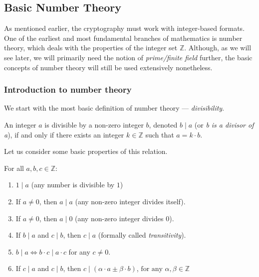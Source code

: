 \documentclass[../lecture-notes.tex]{subfiles}
\begin{document}
\subsection{Basic Number Theory}

As mentioned earlier, the cryptography must work with integer-based formats. 
One of the earliest and most fundamental branches of mathematics is number theory, which 
deals with the properties of the integer set $\mathbb{Z}$. Although, as we will see later, 
we will primarily need the notion of \emph{prime/finite field} further, the basic concepts 
of number theory will still be used extensively nonetheless.

\subsubsection{Introduction to number theory}

We start with the most basic definition of number theory --- \emph{divisibility}.

\begin{definition}
    An integer $a$ is divisible by a non-zero integer $b$, denoted $b \mid a$ (or \emph{b is a divisor of a}), if and only if there exists an integer $k \in \mathbb{Z}$ such that $a = k \cdot b$.
\end{definition}

Let us consider some basic properties of this relation.

\begin{lemma}
    For all $a, b, c \in \mathbb{Z}:$
    \hfill
    \begin{enumerate}
        \item $1 \mid a$ (any number is divisible by $1$)
        \item If $a \neq 0$, then $a \mid a$ (any non-zero integer divides itself).
        \item If $a \neq 0$, then $a \mid 0$ (any non-zero integer divides $0$).
        \item If $b \mid a$ and $c \mid b$, then $c \mid a$ (formally called \emph{transitivity}).
        \item $b \mid a \iff b \cdot c \mid a \cdot c$ for any $c \neq 0$.
        \item If $c \mid a$ and $c \mid b$, then $c \mid (\alpha \cdot a \pm \beta \cdot b)$, $\text{for any } \alpha, \beta \in \mathbb{Z}$
    \end{enumerate}
\end{lemma}
\end{document}
